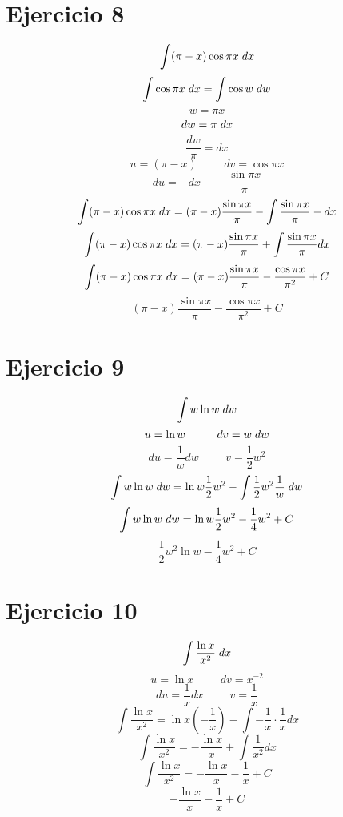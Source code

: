 \documentclass{amsart}
\begin{document}
\section{Ejercicio 8}

    \[\int(\pi - x)\cos{\pi x} \hspace{1mm} dx\]
    \[\int \cos{\pi x} \hspace{1mm} dx = \int \cos{w} \hspace{1mm} dw\]
    \[ w = \pi x \]
    \[ dw = \pi \hspace{1mm} dx\]
    \[\frac{dw}{\pi} = dx\]
    \[ u = (\pi -x) \hspace{1cm} dv = \cos{\pi x}\]
    \[ du = -dx \hspace{1cm} \frac{\sin{\pi x}}{\pi}\]
    \[\int(\pi - x)\cos{\pi x} \hspace{1mm} dx = (\pi - x)\frac{\sin{\pi x}}{\pi} - \int \frac{\sin{\pi x}}{\pi} -dx\]
    \[\int(\pi - x)\cos{\pi x} \hspace{1mm} dx = (\pi - x)\frac{\sin{\pi x}}{\pi} + \int \frac{\sin{\pi x}}{\pi} dx\]
    \[\int(\pi - x)\cos{\pi x} \hspace{1mm} dx = (\pi - x)\frac{\sin{\pi x}}{\pi} - \frac{\cos{\pi x}}{\pi^{2}} + C\]
    \[(\pi - x)\frac{\sin{\pi x}}{\pi} - \frac{\cos{\pi x}}{\pi^{2}} + C\]
    
\section{Ejercicio 9}
    
    \[\int w \ln{w} \hspace{1mm} dw\]
    \[u = \ln{w} \hspace{1cm} dv = w \hspace{1mm} dw\]
    \[du = \frac{1}{w} dw \hspace{1cm} v = \frac{1}{2} w^{2}\]
    \[\int w \ln{w} \hspace{1mm} dw = \ln{w}\frac{1}{2}w^{2} - \int \frac{1}{2}w^{2}\frac{1}{w}\hspace{1mm} dw\]
    \[\int w \ln{w} \hspace{1mm} dw = \ln{w}\frac{1}{2}w^{2} - \frac{1}{4}w^{2} + C\]
    \[\frac{1}{2}w^{2} \ln{w} - \frac{1}{4}w^{2} + C\]
    
\section{Ejercicio 10}
    
    \[\int \frac{\ln{x}}{x^{2}} \hspace{1mm} dx\]
    \[ u = \ln{x} \hspace{1cm} dv = x^{-2}\]
    \[ du = \frac{1}{x} dx \hspace{1cm} v = \frac{1}{x}\]
    \[\int \frac{\ln{x}}{x^{2}} = \ln{x}(-\frac{1}{x}) - \int -\frac{1}{x}\cdot\frac{1}{x} dx\]
    \[\int \frac{\ln{x}}{x^{2}} = -\frac{\ln{x}}{x} + \int \frac{1}{x^{2}} dx\]
    \[\int \frac{\ln{x}}{x^{2}} = -\frac{\ln{x}}{x} - \frac{1}{x} + C\]
    \[-\frac{\ln{x}}{x} - \frac{1}{x} + C\]
    
\end{document}
